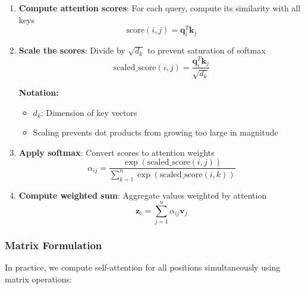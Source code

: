 \begin{enumerate}
    \item \textbf{Compute attention scores}: For each query, compute its similarity with all keys
    \begin{equation}
    \text{score}(i,j) = \mathbf{q}_i^T \mathbf{k}_j
    \end{equation}

    \item \textbf{Scale the scores}: Divide by $\sqrt{d_k}$ to prevent saturation of softmax
    \begin{equation}
    \text{scaled\_score}(i,j) = \frac{\mathbf{q}_i^T \mathbf{k}_j}{\sqrt{d_k}}
    \end{equation}
    \begin{notationbox}
    \textbf{Notation:}
    \begin{itemize}
        \item $d_k$: Dimension of key vectors
        \item Scaling prevents dot products from growing too large in magnitude
    \end{itemize}
    \end{notationbox}

    \item \textbf{Apply softmax}: Convert scores to attention weights
    \begin{equation}
    \alpha_{ij} = \frac{\exp(\text{scaled\_score}(i,j))}{\sum_{k=1}^{n} \exp(\text{scaled\_score}(i,k))}
    \end{equation}

    \item \textbf{Compute weighted sum}: Aggregate values weighted by attention
    \begin{equation}
    \mathbf{z}_i = \sum_{j=1}^{n} \alpha_{ij} \mathbf{v}_j
    \end{equation}
\end{enumerate}

\subsubsection{Matrix Formulation}

In practice, we compute self-attention for all positions simultaneously using matrix operations:

